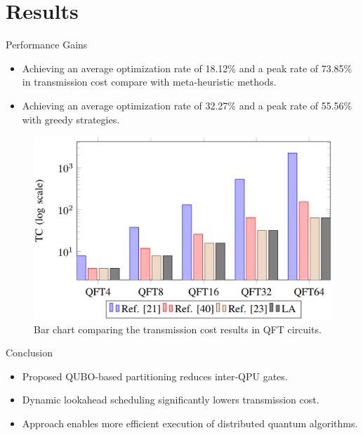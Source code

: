 \documentclass{beamer}
\begin{document}
	\section{Results}
	\begin{frame}{Performance Gains}

		\begin{itemize}
			\item Achieving an average optimization rate of 18.12\% and a peak rate of 73.85\% in transmission cost compare with meta-heuristic methods.
			\item Achieving an average optimization rate of 32.27\% and a peak rate of 55.56\% with greedy strategies.
		\end{itemize}
		\begin{figure}
			\includegraphics[width=.6\textwidth]{figure/TC.png}
			\caption[]{Bar chart comparing the transmission cost results in QFT circuits.}
		\end{figure}
	\end{frame}
	
	
	\begin{frame}{Conclusion}
		\begin{itemize}
			\item Proposed QUBO-based partitioning reduces inter-QPU gates.
			\item Dynamic lookahead scheduling significantly lowers transmission cost.
			\item Approach enables more efficient execution of distributed quantum algorithms.
		\end{itemize}
	\end{frame}
	
	
\end{document}
